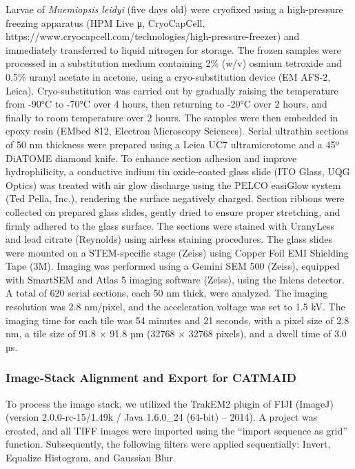 \documentclass[
  11pt,
]{article}
\begin{document}
Larvae of \emph{Mnemiopsis leidyi} (five days old) were cryofixed using
a high-pressure freezing apparatus (HPM Live μ, CryoCapCell,
https://www.cryocapcell.com/technologies/high-pressure-freezer) and
immediately transferred to liquid nitrogen for storage. The frozen
samples were processed in a substitution medium containing 2\% (w/v)
osmium tetroxide and 0.5\% uranyl acetate in acetone, using a
cryo-substitution device (EM AFS-2, Leica). Cryo-substitution was
carried out by gradually raising the temperature from -90°C to -70°C
over 4 hours, then returning to -20°C over 2 hours, and finally to room
temperature over 2 hours. The samples were then embedded in epoxy resin
(EMbed 812, Electron Microscopy Sciences). Serial ultrathin sections of
50 nm thickness were prepared using a Leica UC7 ultramicrotome and a 45º
DiATOME diamond knife. To enhance section adhesion and improve
hydrophilicity, a conductive indium tin oxide-coated glass slide (ITO
Glass, UQG Optics) was treated with air glow discharge using the PELCO
easiGlow system (Ted Pella, Inc.), rendering the surface negatively
charged. Section ribbons were collected on prepared glass slides, gently
dried to ensure proper stretching, and firmly adhered to the glass
surface. The sections were stained with UranyLess and lead citrate
(Reynolds) using airless staining procedures. The glass slides were
mounted on a STEM-specific stage (Zeiss) using Copper Foil EMI Shielding
Tape (3M). Imaging was performed using a Gemini SEM 500 (Zeiss),
equipped with SmartSEM and Atlas 5 imaging software (Zeiss), using the
Inlens detector. A total of 620 serial sections, each 50 nm thick, were
analyzed. The imaging resolution was 2.8 nm/pixel, and the acceleration
voltage was set to 1.5 kV. The imaging time for each tile was 54 minutes
and 21 seconds, with a pixel size of 2.8 nm, a tile size of 91.8 × 91.8
µm (32768 × 32768 pixels), and a dwell time of 3.0 µs.

\subsubsection{Image-Stack Alignment and Export for
CATMAID}\label{image-stack-alignment-and-export-for-catmaid}

To process the image stack, we utilized the TrakEM2 plugin of FIJI
(ImageJ) (version 2.0.0-rc-15/1.49k / Java 1.6.0\_24 (64-bit) -- 2014).
A project was created, and all TIFF images were imported using the
``import sequence as grid'' function. Subsequently, the following
filters were applied sequentially: Invert, Equalize Histogram, and
Gaussian Blur.
\end{document}

